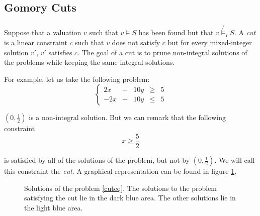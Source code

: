 \documentclass{article}
\newcommand{\ints}{\mathbb{Z}}
\begin{document}
\subsection{Gomory Cuts}

Suppose that a valuation $v$ such that $v \vDash S$ has been found but that
$v \not{\vDash_I} S$. A \textit{cut} is a
linear constraint $c$ such that $v$ does not satisfy $c$ but for every
mixed-integer solution $v'$, $v'$ satisfies $c$. The goal of a cut is
to prune non-integral solutions of the problems while keeping the same integral
solutions.

For example, let us take the following problem:
\begin{equation}
  \label{cuteq}
  \left\{
  \begin{array}{rcccc}
     2x & + & 10y & \geqslant & 5 \\
    -2x & + & 10y & \leqslant & 5
  \end{array}
  \right.
\end{equation}

$(0, \frac{1}{2})$ is a non-integral solution. But we can remark that the
following constraint $$x \geqslant \frac{5}{2}$$

is satisfied by all of the
solutions of the problem, but not by $(0, \frac{1}{2})$. We will call this
constraint the \textit{cut}. A graphical representation can be found in figure
\ref{cutfig}.

\begin{figure}[h]
  \label{cutfig}
  \centering


  \caption{Solutions of the problem \ref{cuteq}.
          The solutions to the problem satisfying the cut lie in the dark blue
          area. The other solutions lie in the light blue area.
          }
\end{figure}
\end{document}
